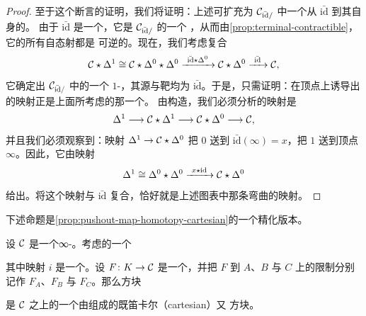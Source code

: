 \begin{proof}
至于这个断言的证明，我们将证明：上述\trMorphism{}可扩充为
$\mathcal{C}_{\bar{\mathrm{id}}/}$ 中一个从 $\bar{\mathrm{id}}$ 到其自身的\trMorphism{}。
由于 $\bar{\mathrm{id}}$ 是一个\trColimit{}\trCone{}，它是 $\mathcal{C}_{\bar{\mathrm{id}}/}$ 的一个%
\trInitialObject{}，从而由\cref{prop:terminal-contractible}，它的所有自态射都是%
可逆的。现在，我们考虑复合
\[
\mathcal{C} \star \Delta^1 \cong \mathcal{C} \star \Delta^0 \star \Delta^0
  \xrightarrow{\ \bar{\mathrm{id}} \star \Delta^0\ } \mathcal{C} \star \Delta^0
  \xrightarrow{\ \bar{\mathrm{id}}\ } \mathcal{C},
\]
它确定出 $\mathcal{C}_{\bar{\mathrm{id}}/}$ 中的一个 $1$-\trSimplex{}，其源与靶均为
$\bar{\mathrm{id}}$。于是，只需证明：在\trCone{}顶点上诱导出的映射正是上面所考虑的那一个。
由构造，我们必须分析的映射是
\[
\Delta^1 \longrightarrow \mathcal{C} \star \Delta^1
  \longrightarrow \mathcal{C} \star \Delta^0 \longrightarrow \mathcal{C},
\]
并且我们必须观察到：映射 $\Delta^1 \to \mathcal{C} \star \Delta^0$ 把 $0$ 送到
$\bar{\mathrm{id}}(\infty) = x$，把 $1$ 送到\trCone{}顶点 $\infty$。因此，它由映射
\[
\Delta^1 \cong \Delta^0 \star \Delta^0
  \xrightarrow{\ x \star \mathrm{id}\ } \mathcal{C} \star \Delta^0
\]
给出。将这个映射与 $\bar{\mathrm{id}}$ 复合，恰好就是上述图表中那条弯曲的映射。
\end{proof}

下述命题是\cref{prop:pushout-map-homotopy-cartesian}的一个精化版本。

\begin{proposition}\label{prop:fat-slice-pushout-cartesian}
设 $\mathcal{C}$ 是一个∞-\trCategory{}。考虑\trSimplicialSets{}的一个\trPushout{}%
\begin{center}
\end{center}
其中映射 $i$ 是一个\trMonomorphism{}。设 $F\colon K \to \mathcal{C}$ 是一个\trFunctor{}，并把
$F$ 到 $A$、$B$ 与 $C$ 上的限制分别记作 $F_A$、$F_B$ 与 $F_C$。那么方块
\begin{center}
\end{center}
是 $\mathcal{C}$ 之上的一个由\trLeftFibration{}组成的既笛卡尔（cartesian）又%
\trHomotopyCartesian{}方块。
\end{proposition}

